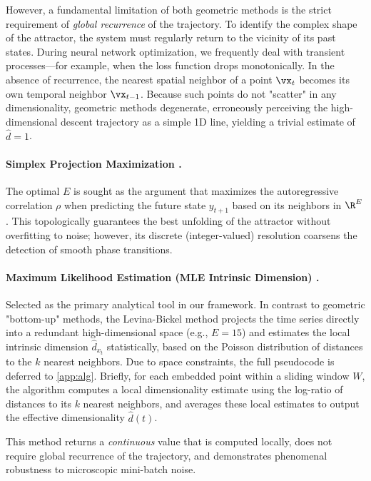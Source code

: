 \documentclass{article}
\begin{document}
However, a fundamental limitation of both geometric methods is the strict requirement of \textit{global recurrence} of the trajectory. To identify the complex shape of the attractor, the system must regularly return to the vicinity of its past states. During neural network optimization, we frequently deal with transient processes—for example, when the loss function drops monotonically. In the absence of recurrence, the nearest spatial neighbor of a point $\vx_t$ becomes its own temporal neighbor $\vx_{t-1}$. Because such points do not "scatter" in any dimensionality, geometric methods degenerate, erroneously perceiving the high-dimensional descent trajectory as a simple 1D line, yielding a trivial estimate of $\hat{d}=1$.

\paragraph{Simplex Projection Maximization \citep{sugihara1990nonlinear}.}
The optimal $E$ is sought as the argument that maximizes the autoregressive correlation $\rho$ when predicting the future state $y_{t+1}$ based on its neighbors in $\R^E$. This topologically guarantees the best unfolding of the attractor without overfitting to noise; however, its discrete (integer-valued) resolution coarsens the detection of smooth phase transitions.

\paragraph{Maximum Likelihood Estimation (MLE Intrinsic Dimension) \citep{levina2004maximum}.}
Selected as the primary analytical tool in our framework. In contrast to geometric "bottom-up" methods, the Levina-Bickel method projects the time series directly into a redundant high-dimensional space (e.g., $E=15$) and estimates the local intrinsic dimension $\hat{d}_{x_t}$ statistically, based on the Poisson distribution of distances to the $k$ nearest neighbors. Due to space constraints, the full pseudocode is deferred to \cref{app:alg}. Briefly, for each embedded point within a sliding window $W$, the algorithm computes a local dimensionality estimate using the log-ratio of distances to its $k$ nearest neighbors, and averages these local estimates to output the effective dimensionality $\hat{d}(t)$.

This method returns a \textit{continuous} value that is computed locally, does not require global recurrence of the trajectory, and demonstrates phenomenal robustness to microscopic mini-batch noise.
\end{document}
